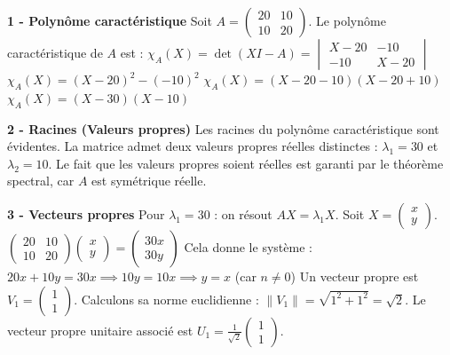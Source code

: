 \documentclass[11pt,a4paper]{article}
\begin{document}
\textbf{1 - Polynôme caractéristique}
Soit $A = \begin{pmatrix} 20 & 10 \\ 10 & 20 \end{pmatrix}$.
Le polynôme caractéristique de $A$ est :
$\chi_A(X) = \det(X I - A) = \begin{vmatrix} X - 20 & -10 \\ -10 & X - 20 \end{vmatrix}$
$\chi_A(X) = (X - 20)^2 - (-10)^2$
$\chi_A(X) = (X - 20 - 10)(X - 20 + 10)$
$\chi_A(X) = (X - 30)(X - 10)$

\textbf{2 - Racines (Valeurs propres)}
Les racines du polynôme caractéristique sont évidentes. La matrice admet deux valeurs propres réelles distinctes :
$\lambda_1 = 30$ et $\lambda_2 = 10$.
Le fait que les valeurs propres soient réelles est garanti par le théorème spectral, car $A$ est symétrique réelle.

\textbf{3 - Vecteurs propres}
Pour $\lambda_1 = 30$ : on résout $AX = \lambda_1 X$.
Soit $X = \begin{pmatrix} x \\ y \end{pmatrix}$.
$\begin{pmatrix} 20 & 10 \\ 10 & 20 \end{pmatrix} \begin{pmatrix} x \\ y \end{pmatrix} = \begin{pmatrix} 30x \\ 30y \end{pmatrix}$
Cela donne le système :
$20x + 10y = 30x \implies 10y = 10x \implies y = x$ (car $n \neq 0$)
Un vecteur propre est $V_1 = \begin{pmatrix} 1 \\ 1 \end{pmatrix}$.
Calculons sa norme euclidienne : $\|V_1\| = \sqrt{1^2 + 1^2} = \sqrt{2}$.
Le vecteur propre unitaire associé est $U_1 = \frac{1}{\sqrt{2}} \begin{pmatrix} 1 \\ 1 \end{pmatrix}$.
\end{document}
